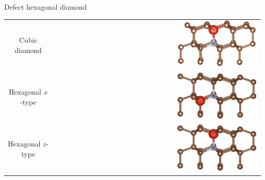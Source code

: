 \documentclass[notes=hide]{beamer}
\begin{document}
\begin{frame}{Defect hexagonal diamond}
  \begin{center}
    \begin{tabular}{cr}
      Cubic diamond   & \includegraphics[width=0.4\textwidth]{images/POSCAR_16_view.png}\\
      Hexagonal $ x $-type &\includegraphics[width=0.4\textwidth]{images/POSCAR_16_x_view.png}\\
      Hexagonal $ z $-type & \includegraphics[width=0.4\textwidth]{images/POSCAR_16_z_view.png}
    \end{tabular}
  \end{center}
\end{frame}



\end{document}
